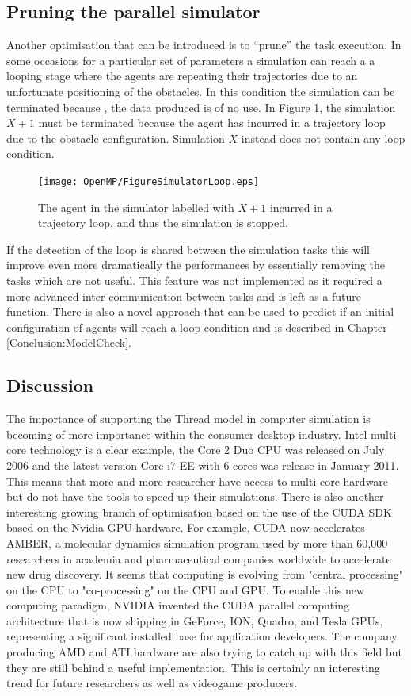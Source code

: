 \subsection{Pruning the parallel simulator}
Another optimisation that can be introduced is to ``prune'' the task execution.
In some occasions for a particular set of parameters a simulation can reach a
a looping stage where the agents are repeating their trajectories due to
an unfortunate positioning of the obstacles.
In this condition the simulation can be terminated because , the data produced
is of no use.
In Figure \ref{Fig:Parallel:pruneSim}, the simulation $X+1$ must be terminated
because the agent has incurred in a trajectory loop due to the obstacle configuration.
Simulation $X$ instead does not contain any loop condition.
\begin{figure}[htbp]
\begin{center}
\texttt{[image: OpenMP/FigureSimulatorLoop.eps]}
\end{center}
\small{
\caption[Pruning parallel simulations]{
The agent in the simulator labelled with $X+1$ incurred in a trajectory loop,
and thus the simulation is stopped.
\label{Fig:Parallel:pruneSim}}}
\end{figure}
If the detection of the loop is shared between the simulation tasks this will
improve even more dramatically the performances by essentially removing
the tasks which are not useful.
This feature was not implemented as it required a more advanced inter communication
between tasks and is left as a future function.
There is also a novel approach that can be used to predict if an initial
configuration of agents will reach a loop condition and is described
in Chapter \ref{Conclusion:ModelCheck}.

\subsection{Discussion}
The importance of supporting the Thread model in computer simulation is becoming
of more importance within the consumer desktop industry.
Intel multi core technology is a clear example, the Core 2 Duo CPU was released
on July 2006 and the latest version Core i7 EE with 6 cores was release in January 2011.
This means that more and more researcher have access to multi core hardware
but do not have the tools to speed up their simulations.
There is also another interesting growing branch of optimisation based on the
use of the CUDA SDK based on the Nvidia GPU hardware.
For example, CUDA now accelerates AMBER, a molecular dynamics simulation program
 used by more than 60,000 researchers in academia and pharmaceutical companies
 worldwide to accelerate new drug discovery.
It seems that computing is evolving from "central processing" on the CPU
to "co-processing" on the CPU and GPU. To enable this new computing paradigm,
NVIDIA invented the CUDA parallel computing architecture that is now shipping in
GeForce, ION, Quadro, and Tesla GPUs, representing a significant installed
 base for application developers.
The company producing AMD and ATI hardware are also trying to catch up with 
this field but they are still behind a useful implementation.
This is certainly an interesting trend for future researchers as well as
videogame producers.


